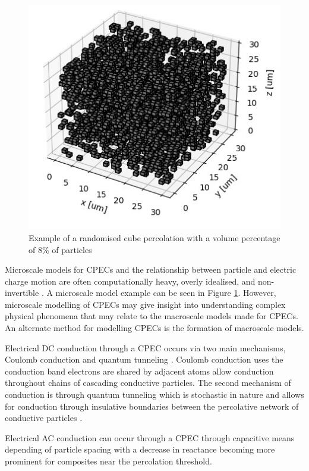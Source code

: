 \begin{figure}[H]
    \centering
    \includegraphics[width=0.6\linewidth]{Figures/simple_random_percolation.jpg}
    \caption{Example of a randomised cube percolation with a volume percentage of 8\% of particles}
    \label{fig:simp_rand_perc}
\end{figure}

Microscale models for CPECs and the relationship between particle and electric charge motion are often computationally heavy, overly idealised, and non-invertible \cite{Wang2022}. A microscale model example can be seen in Figure \ref{fig:simp_rand_perc}. However, microscale modelling of CPECs may give insight into understanding complex physical phenomena that may relate to the macroscale models made for CPECs. An alternate method for modelling CPECs is the formation of macroscale models\cite{Neffati2019}.

Electrical DC conduction through a CPEC occurs via two main mechanisms, Coulomb conduction and quantum tunneling \cite{Bloor2006,Duan2014,Zhang2007,Madrid2017}. Coulomb conduction uses the conduction band electrons are shared by adjacent atoms allow conduction throughout chains of cascading conductive particles. The second mechanism of conduction is through quantum tunneling which is stochastic in nature and allows for conduction through insulative boundaries between the percolative network of conductive particles \cite{Hu2008,Grimaldi2006}. 

Electrical AC conduction can occur through a CPEC through capacitive means depending of particle spacing with a decrease in reactance becoming more prominent for composites near the percolation threshold\cite{HindermannBischoff2001}.



